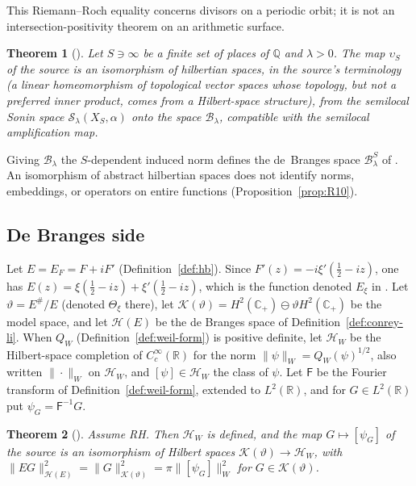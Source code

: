 \documentclass[11pt]{amsart}
\theoremstyle{plain}
\newtheorem{theorem}{Theorem}[section]
\theoremstyle{definition}
\theoremstyle{remark}
\numberwithin{equation}{section}
\newcommand{\R}{\mathbb{R}}
\newcommand{\Q}{\mathbb{Q}}
\newcommand{\Cp}{\mathbb{C}_{+}}
\begin{document}
This Riemann--Roch equality concerns divisors on a periodic orbit; it is
not an intersection-positivity theorem on an arithmetic surface.

\begin{theorem}[{\cite[Proposition~4.8, p.~24]%
{ConnesConsaniMoscovici2024Prolate}}]\label{thm:imp-ccm23}
Let $S\ni\infty$ be a finite set of places of $\Q$ and $\lambda>0$.
The map $\upsilon_S$ of the source is an isomorphism of hilbertian
spaces, in the source's terminology (a linear homeomorphism of
topological vector spaces whose topology, but not a preferred inner
product, comes from a Hilbert-space structure), from the semilocal Sonin space
$\mathcal S_\lambda(X_S,\alpha)$ onto the space $\mathcal B_\lambda$,
compatible with the semilocal amplification map.
\end{theorem}

Giving $\mathcal B_\lambda$ the $S$-dependent induced norm defines the
de~Branges space $\mathcal B^S_\lambda$ of \cite[\S4.8.3]%
{ConnesConsaniMoscovici2024Prolate}. An isomorphism of abstract
hilbertian spaces does not identify norms, embeddings, or operators on
entire functions (Proposition~\ref{prop:R10}).

\subsection{De Branges side}

Let $E=E_F=F+iF'$ (Definition~\ref{def:hb}). Since
$F'(z)=-i\xi'(\tfrac12-iz)$, one has
$E(z)=\xi(\tfrac12-iz)+\xi'(\tfrac12-iz)$, which is the function
denoted $E_\xi$ in \cite[(1.3), p.~2]{Suzuki2023WeilHilbert}. Let
$\vartheta=E^\#/E$ (denoted $\Theta_\xi$ there), let
$\mathcal K(\vartheta)=H^2(\Cp)\ominus\vartheta H^2(\Cp)$ be the model
space, and let $\mathcal H(E)$ be the de Branges space of
Definition~\ref{def:conrey-li}. When $Q_W$
(Definition~\ref{def:weil-form}) is positive definite, let
$\mathcal H_W$ be the Hilbert-space completion of $C_c^\infty(\R)$ for
the norm $\|\psi\|_W=Q_W(\psi)^{1/2}$, also written $\|\cdot\|_W$ on
$\mathcal H_W$, and $[\psi]\in\mathcal H_W$ the class of $\psi$. Let
$\mathsf F$ be the Fourier transform of Definition~\ref{def:weil-form},
extended to $L^2(\R)$, and for $G\in L^2(\R)$ put
$\psi_G=\mathsf F^{-1}G$.

\begin{theorem}[{\cite[Theorem~1.1, p.~2]{Suzuki2023WeilHilbert}}]
\label{thm:imp-sz23}
Assume RH. Then $\mathcal H_W$ is defined, and the map
$G\mapsto[\psi_G]$ of the source is an isomorphism of Hilbert spaces
$\mathcal K(\vartheta)\to\mathcal H_W$, with
$\|EG\|^2_{\mathcal H(E)}=\|G\|^2_{\mathcal K(\vartheta)}
=\pi\|[\psi_G]\|_W^2$ for $G\in\mathcal K(\vartheta)$.
\end{theorem}
\end{document}
